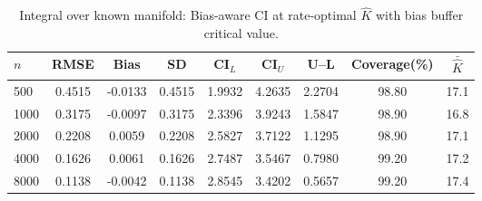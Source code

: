 \begin{table}[!h]
\centering
\small
\caption{Integral over known manifold: Bias-aware CI at rate-optimal $\hat{K}$ with bias buffer critical value.}
\label{tab:Sim1_Circle_BiasAware}
\begin{tabular}{lcccccccc}
\hline\hline
$n$ & RMSE & Bias & SD & CI$_L$ & CI$_U$ & U--L & Coverage(\%) & $\bar{\hat{K}}$\\
\hline
500 & 0.4515 & -0.0133 & 0.4515 & 1.9932 & 4.2635 & 2.2704 & 98.80 & 17.1\\
1000 & 0.3175 & -0.0097 & 0.3175 & 2.3396 & 3.9243 & 1.5847 & 98.90 & 16.8\\
2000 & 0.2208 & 0.0059 & 0.2208 & 2.5827 & 3.7122 & 1.1295 & 98.90 & 17.1\\
4000 & 0.1626 & 0.0061 & 0.1626 & 2.7487 & 3.5467 & 0.7980 & 99.20 & 17.2\\
8000 & 0.1138 & -0.0042 & 0.1138 & 2.8545 & 3.4202 & 0.5657 & 99.20 & 17.4\\
\hline\hline
\end{tabular}
\end{table}
